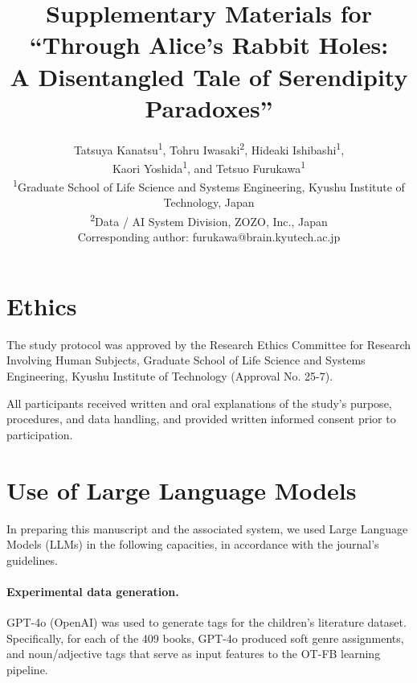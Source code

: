 \documentclass[11pt,a4paper]{article}
\begin{document}
\title{Supplementary Materials for \\
    ``Through Alice's Rabbit Holes: \\
    A Disentangled Tale of Serendipity Paradoxes''}
\author{
    Tatsuya Kanatsu\textsuperscript{1}, Tohru Iwasaki\textsuperscript{2}, Hideaki Ishibashi\textsuperscript{1}, \\
    Kaori Yoshida\textsuperscript{1}, and Tetsuo Furukawa\textsuperscript{1} \\[3pt]
    \small \textsuperscript{1}Graduate School of Life Science and Systems Engineering, Kyushu Institute of Technology, Japan \\
    \small \textsuperscript{2}Data / AI System Division, ZOZO, Inc., Japan \\
    \small Corresponding author: furukawa@brain.kyutech.ac.jp
}
\date{}
\maketitle

\section{Ethics}
The study protocol was approved by the Research Ethics Committee
for Research Involving Human Subjects, Graduate School of Life
Science and Systems Engineering, Kyushu Institute of Technology
(Approval No. 25-7).

All participants received written and oral explanations of the
study's purpose, procedures, and data handling, and provided
written informed consent prior to participation.



\section{Use of Large Language Models}\label{sup:use_of_llms}
In preparing this manuscript and the associated system, we used Large Language Models (LLMs)
in the following capacities, in accordance with the journal's guidelines.

\paragraph{Experimental data generation.}
GPT-4o (OpenAI) was used to generate tags for the children's literature dataset.
Specifically, for each of the 409 books, GPT-4o produced soft genre assignments,
and noun/adjective tags that serve as input features to the
OT-FB learning pipeline.
\end{document}
